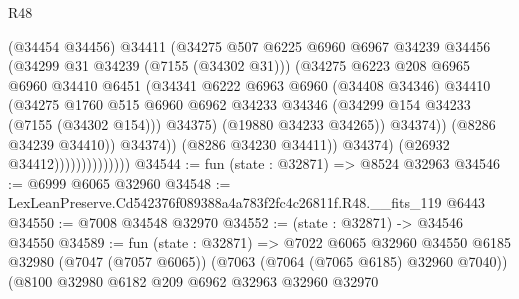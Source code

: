 \begin{lexlean}{R48}
\begin{coremodule}
                                        (@34454 @34456)
                                        @34411
                                        (@34275
                                          @507
                                          @6225
                                          @6960
                                          @6967
                                          @34239
                                          @34456
                                          (@34299 @31 @34239 (@7155 (@34302 @31)))
                                          (@34275
                                            @6223
                                            @208
                                            @6965
                                            @6960
                                            @34410
                                            @6451
                                            (@34341
                                              @6222
                                              @6963
                                              @6960
                                              (@34408 @34346)
                                              @34410
                                              (@34275
                                                @1760
                                                @515
                                                @6960
                                                @6962
                                                @34233
                                                @34346
                                                (@34299 @154 @34233 (@7155 (@34302 @154)))
                                                @34375)
                                              (@19880 @34233 @34265))
                                            @34374))
                                        (@8286 @34239 @34410))
                                      @34374))
                                  (@8286 @34230 @34411))
                                @34374)
                              (@26932 @34412))))))))))))))
@34544 := fun (state : @32871) => @8524 @32963
@34546 := @6999 @6065 @32960
@34548 := LexLeanPreserve.Cd542376f089388a4a783f2fc4c26811f.R48.__fits_119 @6443
@34550 := @7008 @34548 @32970
@34552 := (state : @32871) -> @34546 @34550
@34589 := fun (state : @32871) =>
  @7022
    @6065
    @32960
    @34550
    @6185
    @32980
    (@7047 (@7057 @6065))
    (@7063 (@7064 (@7065 @6185) @32960 @7040))
    (@8100
      @32980
      @6182
      @209
      @6962
      @32963
      @32960
      @32970

\end{coremodule}
\end{lexlean}
